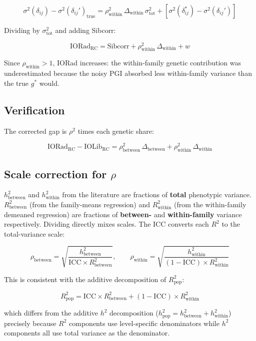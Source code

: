 \documentclass[
]{article}
\begin{document}
\[\sigma^2(\delta_{ij}) - \sigma^2(\delta_{ij}')_\text{true} = \rho^2_\text{within}\,\Delta_\text{within}\,\sigma^2_\text{tot} + [\sigma^2(\delta_{ij}^*) - \sigma^2(\delta_{ij}')]\]

Dividing by \(\sigma^2_\text{tot}\) and adding Sibcorr:

\[\boxed{\text{IORad}_\text{RC} = \text{Sibcorr} + \rho^2_\text{within}\,\Delta_\text{within} + w}\]

Since \(\rho_\text{within} > 1\), IORad increases: the within-family
genetic contribution was underestimated because the noisy PGI absorbed
less within-family variance than the true \(g^*\) would.


\subsection{Verification}\label{verification}

The corrected gap is \(\rho^2\) times each genetic share:

\[\text{IORad}_\text{RC} - \text{IOLib}_\text{RC} = \rho^2_\text{between}\,\Delta_\text{between} + \rho^2_\text{within}\,\Delta_\text{within} \]


\subsection{\texorpdfstring{Scale correction for
\(\rho\)}{Scale correction for \textbackslash rho}}\label{scale-correction-for-rho}

\(h^2_\text{between}\) and \(h^2_\text{within}\) from the literature are
fractions of \textbf{total} phenotypic variance. \(R^2_\text{between}\)
(from the family-means regression) and \(R^2_\text{within}\) (from the
within-family demeaned regression) are fractions of \textbf{between-}
and \textbf{within-family} variance respectively. Dividing directly
mixes scales. The ICC converts each \(R^2\) to the total-variance scale:

\[\rho_\text{between} = \sqrt{\frac{h^2_\text{between}}{\text{ICC} \times R^2_\text{between}}}, \qquad \rho_\text{within} = \sqrt{\frac{h^2_\text{within}}{(1 - \text{ICC}) \times R^2_\text{within}}}\]

This is consistent with the additive decomposition of
\(R^2_\text{pop}\):

\[R^2_\text{pop} = \text{ICC} \times R^2_\text{between} + (1 - \text{ICC}) \times R^2_\text{within}\]

which differs from the additive \(h^2\) decomposition
(\(h^2_\text{pop} = h^2_\text{between} + h^2_\text{within}\)) precisely
because \(R^2\) components use level-specific denominators while \(h^2\)
components all use total variance as the denominator.
\end{document}
